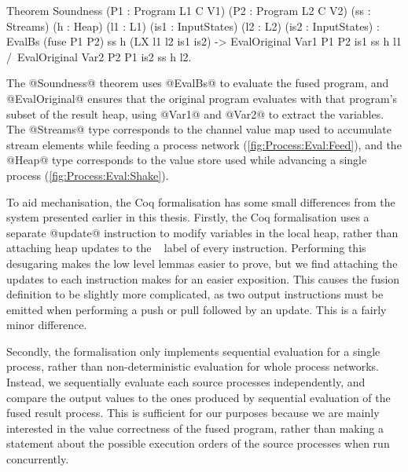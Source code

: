 
\begin{coq}
Theorem Soundness (P1 : Program L1 C V1) (P2  : Program L2 C V2)
                  (ss : Streams)         (h   : Heap)
                  (l1 : L1)              (is1 : InputStates)
                  (l2 : L2)              (is2 : InputStates)
  :  EvalBs (fuse P1 P2) ss h (LX l1 l2 is1 is2)
  -> EvalOriginal Var1 P1 P2 is1 ss h l1
  /\ EvalOriginal Var2 P2 P1 is2 ss h l2.
\end{coq}

The @Soundness@ theorem uses @EvalBs@ to evaluate the fused program, and @EvalOriginal@ ensures that the original program evaluates with that program's subset of the result heap, using @Var1@ and @Var2@ to extract the variables.
The @Streams@ type corresponds to the channel value map used to accumulate stream elements while feeding a process network (\autoref{fig:Process:Eval:Feed}), and the @Heap@ type corresponds to the value store used while advancing a single process (\autoref{fig:Process:Eval:Shake}).


To aid mechanisation, the Coq formalisation has some small differences from the system presented earlier in this thesis.
Firstly, the Coq formalisation uses a separate @update@ instruction to modify variables in the local heap, rather than attaching heap updates to the \Next~ label of every instruction.
Performing this desugaring makes the low level lemmas easier to prove, but we find attaching the updates to each instruction makes for an easier exposition.
This causes the fusion definition to be slightly more complicated, as two output instructions must be emitted when performing a push or pull followed by an update.
This is a fairly minor difference.

Secondly, the formalisation only implements sequential evaluation for a single process, rather than non-deterministic evaluation for whole process networks.
Instead, we sequentially evaluate each source processes independently, and compare the output values to the ones produced by sequential evaluation of the fused result process.
This is sufficient for our purposes because we are mainly interested in the value correctness of the fused program, rather than making a statement about the possible execution orders of the source processes when run concurrently.

